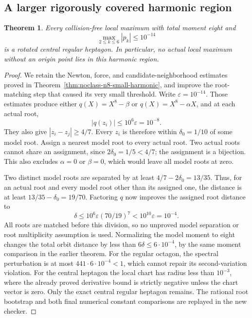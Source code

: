 \documentclass[11pt]{article}
\newtheorem{theorem}{Theorem}[section]
\theoremstyle{remark}
\numberwithin{equation}{section}
\begin{document}
\subsection{A larger rigorously covered harmonic region}
\begin{theorem}\label{thm:noorigin-oct7-eight-improvedharmonic}
Every collision-free local maximum with total moment eight and
\[
                    \max_{2\le k\le6}|p_k|\le10^{-14}
\]
is a rotated central regular heptagon. In particular, no actual
local maximum without an origin point lies in this harmonic region.
\end{theorem}
\begin{proof}
We retain the Newton, force, and candidate-neighborhood estimates
proved in Theorem~\ref{thm:noclass-n8-small-harmonic}, and improve the
root-matching step that caused its very small threshold.
Write $\varepsilon=10^{-14}$. Those estimates produce either
$q(X)=X^8-\beta$ or $q(X)=X^8-\alpha X$, and at each actual root,
\[
                   |q(z_i)|\le10^6\varepsilon=10^{-8}.
\]
They also give $|z_i-z_j|\ge4/7$. Every $z_i$ is therefore
within $\delta_0=1/10$ of some model root. Assign a nearest model
root to every actual root. Two actual roots cannot share an
assignment, since $2\delta_0=1/5<4/7$; the assignment is a
bijection. This also excludes $\alpha=0$ or $\beta=0$, which
would leave all model roots at zero.

Two distinct model roots are separated by at least
$4/7-2\delta_0=13/35$. Thus, for an actual root and every model
root other than its assigned one, the distance is at least
$13/35-\delta_0=19/70$. Factoring $q$ now improves the assigned
root distance to
\[
 \delta\le10^6\varepsilon(70/19)^7
              <10^{10}\varepsilon=10^{-4}.
\]
All roots are matched before this division, so no unproved model
separation or root multiplicity assumption is used.
Normalizing the model moment to eight changes the total orbit
distance by less than $6\delta\le6\cdot10^{-4}$, by the same
moment comparison in the earlier theorem. For the regular octagon,
the spectral perturbation is at most $441\cdot6\cdot10^{-4}<1$,
which cannot repair its second-variation violation. For the central
heptagon the local chart has radius less than $10^{-3}$, where the
already proved derivative bound is strictly negative unless the
chart vector is zero. Only the exact central regular heptagon
remains. The rational root bootstrap and both final numerical
constant comparisons are replayed in the new checker.
\end{proof}
\end{document}
